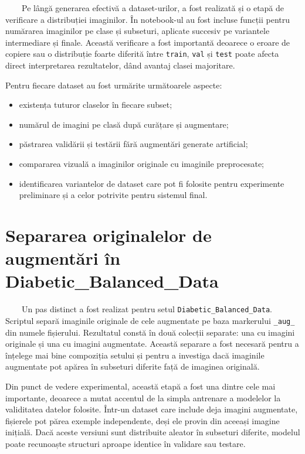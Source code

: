 \documentclass[12pt, a4paper, twoside, romanian]{teza-upb}
\begin{document}
\ \ \ \ Pe lângă generarea efectivă a dataset-urilor, a fost realizată și o etapă de verificare
a distribuției imaginilor. În notebook-ul  au fost incluse
funcții pentru numărarea imaginilor pe clase și subseturi, aplicate succesiv pe variantele
intermediare și finale. Această verificare a fost importantă deoarece o eroare de copiere sau
o distribuție foarte diferită între \texttt{train}, \texttt{val} și \texttt{test} poate afecta
direct interpretarea rezultatelor, dând avantaj clasei majoritare.
\bigskip
\bigskip 

Pentru fiecare dataset au fost urmărite următoarele aspecte:

\begin{itemize}
  \item existența tuturor claselor în fiecare subset;
  \item numărul de imagini pe clasă după curățare și augmentare;
  \item păstrarea validării și testării fără augmentări generate artificial;
  \item compararea vizuală a imaginilor originale cu imaginile preprocesate;
  \item identificarea variantelor de dataset care pot fi folosite pentru experimente preliminare și a celor potrivite pentru sistemul final.
\end{itemize}

\section{Separarea originalelor de augmentări în Diabetic\_Balanced\_Data}

\ \ \ \ Un pas distinct a fost realizat pentru setul \texttt{Diabetic\_Balanced\_Data}. Scriptul
 separă imaginile
originale de cele augmentate pe baza markerului \texttt{\_aug\_} din numele fișierului.
Rezultatul constă în două colecții separate: una cu imagini originale și una cu imagini
augmentate. Această separare a fost necesară pentru a înțelege mai bine compoziția setului
și pentru a investiga dacă imaginile augmentate pot apărea în subseturi diferite față de
imaginea originală.
\bigskip

Din punct de vedere experimental, această etapă a fost una dintre cele mai importante, deoarece
a mutat accentul de la simpla antrenare a modelelor la validitatea datelor folosite. Într-un
dataset care include deja imagini augmentate, fișierele pot părea exemple independente, deși
ele provin din aceeași imagine inițială. Dacă aceste versiuni sunt distribuite aleator în
subseturi diferite, modelul poate recunoaște structuri aproape identice în validare sau testare.
\end{document}
